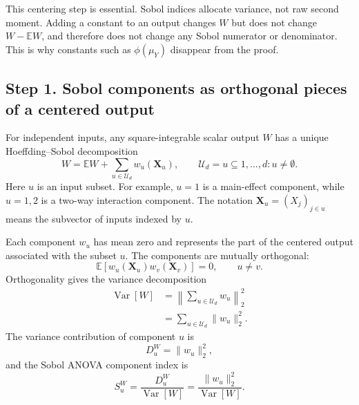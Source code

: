 \documentclass[11pt,letterpaper]{article}
\DeclareMathOperator{\Var}{Var}
\newcommand{\E}{\mathbb{E}}
\newcommand{\bX}{\boldsymbol{X}}
\theoremstyle{remark}
\begin{document}
This centering step is essential. Sobol indices allocate variance, not raw second
moment. Adding a constant to an output changes $W$ but does not change
$W-\E W$, and therefore does not change any Sobol numerator or denominator.
This is why constants such as $\phi(\mu_Y)$ disappear from the proof.

\subsection*{Step 1. Sobol components as orthogonal pieces of a centered output}

For independent inputs, any square-integrable scalar output $W$ has a unique
Hoeffding--Sobol decomposition
\begin{equation}
  W=\E W+\sum_{u\in\mathcal U_d}w_u(\bX_u),
  \qquad
  \mathcal U_d={u\subseteq{1,\ldots,d}:u\neq\emptyset}.
\end{equation}
Here $u$ is an input subset. For example, $u={1}$ is a main-effect component,
while $u={1,2}$ is a two-way interaction component. The notation
$\bX_u=(X_j)_{j\in u}$ means the subvector of inputs indexed by $u$.

Each component $w_u$ has mean zero and represents the part of the centered output
associated with the subset $u$. The components are mutually orthogonal:
\begin{equation}
  \E[w_u(\bX_u)w_v(\bX_v)]=0,
  \qquad u\neq v.
\end{equation}
Orthogonality gives the variance decomposition
\begin{align}
  \Var[W]
  &=\left\|\sum_{u\in\mathcal U_d}w_u\right\|_2^2 \\
  &=\sum_{u\in\mathcal U_d}\|w_u\|_2^2.
\end{align}
The variance contribution of component $u$ is
\begin{equation}
  D_u^W=\|w_u\|_2^2,
\end{equation}
and the Sobol ANOVA component index is
\begin{equation}
  S_u^W=\frac{D_u^W}{\Var[W]}
       =\frac{\|w_u\|_2^2}{\Var[W]}.
\end{equation}
\end{document}
